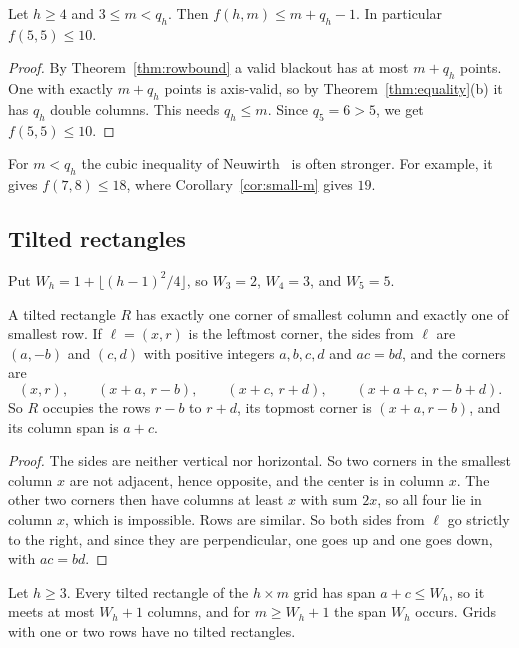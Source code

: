 \begin{corollary}\label{cor:small-m}
Let $h\ge4$ and $3\le m<q_h$. Then $f(h,m)\le m+q_h-1$. In particular $f(5,5)\le10$.
\end{corollary}

\begin{proof}
By Theorem~\ref{thm:rowbound} a valid blackout has at most $m+q_h$ points. One with exactly $m+q_h$ points is axis-valid, so by Theorem~\ref{thm:equality}(b) it has $q_h$ double columns. This needs $q_h\le m$. Since $q_5=6>5$, we get $f(5,5)\le10$.
\end{proof}

For $m<q_h$ the cubic inequality of Neuwirth~\cite[Theorem~1(i)]{neuwirth2001} is often stronger. For example, it gives $f(7,8)\le18$, where Corollary~\ref{cor:small-m} gives $19$.

\subsection{Tilted rectangles}

Put $W_h=1+\lfloor(h-1)^2/4\rfloor$, so $W_3=2$, $W_4=3$, and $W_5=5$.

\begin{lemma}\label{lem:leftmost}
A tilted rectangle $R$ has exactly one corner of smallest column and exactly one of smallest row. If $\ell=(x,r)$ is the leftmost corner, the sides from $\ell$ are $(a,-b)$ and $(c,d)$ with positive integers $a,b,c,d$ and $ac=bd$, and the corners are
\begin{equation}\label{eq:tilt-param}
(x,r),\qquad(x+a,\,r-b),\qquad(x+c,\,r+d),\qquad(x+a+c,\,r-b+d).
\end{equation}
So $R$ occupies the rows $r-b$ to $r+d$, its topmost corner is $(x+a,r-b)$, and its column span is $a+c$.
\end{lemma}

\begin{proof}
The sides are neither vertical nor horizontal. So two corners in the smallest column $x$ are not adjacent, hence opposite, and the center is in column $x$. The other two corners then have columns at least $x$ with sum $2x$, so all four lie in column $x$, which is impossible. Rows are similar. So both sides from $\ell$ go strictly to the right, and since they are perpendicular, one goes up and one goes down, with $ac=bd$.
\end{proof}

\begin{lemma}\label{lem:span}
Let $h\ge3$. Every tilted rectangle of the $h\times m$ grid has span $a+c\le W_h$, so it meets at most $W_h+1$ columns, and for $m\ge W_h+1$ the span $W_h$ occurs. Grids with one or two rows have no tilted rectangles.
\end{lemma}

